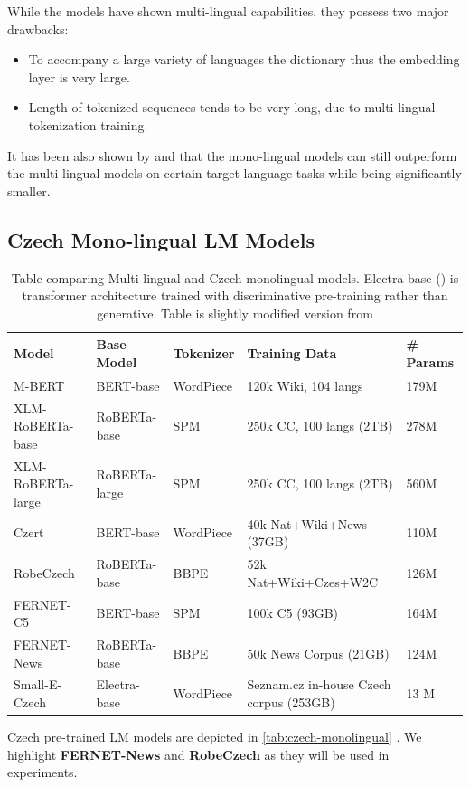 While the models have shown multi-lingual capabilities,
they possess two major drawbacks:
\begin{itemize}
    \item To accompany a large variety of languages the dictionary thus the embedding layer is very large.
    \item Length of tokenized sequences tends to be very long, due to multi-lingual tokenization training.
\end{itemize}
It has been also shown by \cite{strakaRobeCzechCzechRoBERTa2021} and \cite{scheibleGottBERTPureGerman2020} that the
mono-lingual models can still outperform the multi-lingual models on certain target language tasks while being significantly smaller.

\subsection{Czech Mono-lingual LM Models}
    \begin{table}[h]
    \centering\footnotesize\sf
    \begin{tabular}{|l|l|l|l|l|}
    \toprule
    Model & Base Model & Tokenizer & Training Data & \# Params \\
    \midrule
    M-BERT \cite{devlinBERTPretrainingDeep2019a} & BERT-base & WordPiece & 120k Wiki, 104 langs & 179M \\
    XLM-RoBERTa-base \cite{conneauUnsupervisedCrosslingualRepresentation2020} & RoBERTa-base & SPM & 250k CC, 100 langs (2TB) & 278M \\
    XLM-RoBERTa-large \cite{conneauUnsupervisedCrosslingualRepresentation2020} & RoBERTa-large & SPM & 250k CC, 100 langs (2TB) & 560M \\
    \midrule
    Czert \cite{sidoCzertCzechBERTlike2021} & BERT-base & WordPiece & 40k Nat+Wiki+News (37GB) & 110M \\
    RobeCzech \cite{strakaRobeCzechCzechRoBERTa2021} & RoBERTa-base & BBPE & 52k Nat+Wiki+Czes+W2C & 126M \\
    FERNET-C5 \cite{leheckaComparisonCzechTransformers2021} & BERT-base & SPM & 100k C5 (93GB) & 164M \\
    FERNET-News \cite{leheckaComparisonCzechTransformers2021} & RoBERTa-base & BBPE & 50k News Corpus (21GB) & 124M \\
    Small-E-Czech \cite{kocianSiameseBERTbasedModel2021} & Electra-base & WordPiece & Seznam.cz in-house Czech corpus (253GB) & 13 M \\
    \bottomrule
    \end{tabular}
    \caption{Table comparing Multi-lingual and Czech monolingual models.
        Electra-base (\cite{clarkELECTRAPretrainingText2020}) is transformer architecture trained 
        with discriminative pre-training rather than generative.
        Table is slightly modified version from \cite{leheckaComparisonCzechTransformers2021}}
    \label{tab:czech-monolingual}
    \end{table}
    Czech pre-trained LM models are depicted in \autoref{tab:czech-monolingual} .
    We highlight \textbf{FERNET-News} and \textbf{RobeCzech} as they will be used in experiments.
